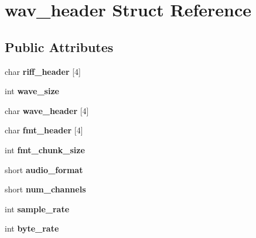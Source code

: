 \hypertarget{structwav__header}{}\section{wav\+\_\+header Struct Reference}
\label{structwav__header}
\subsection*{Public Attributes}
\begin{DoxyCompactItemize}
\item 
\mbox{\label{structwav__header_a977b8193bf1f39dbd815c6210f0bb6c6}} 
char {\bfseries riff\+\_\+header} \mbox{[}4\mbox{]}
\item 
\mbox{\label{structwav__header_a0a545b27959de2954b97469aaba34056}} 
int {\bfseries wave\+\_\+size}
\item 
\mbox{\label{structwav__header_a0dc0cff34ad7fe5e59c5cbcee1640354}} 
char {\bfseries wave\+\_\+header} \mbox{[}4\mbox{]}
\item 
\mbox{\label{structwav__header_a4039d1e8e91d7940aa45a29aad27b4ce}} 
char {\bfseries fmt\+\_\+header} \mbox{[}4\mbox{]}
\item 
\mbox{\label{structwav__header_a5fb4363d52bbff51ca2e8884408208c6}} 
int {\bfseries fmt\+\_\+chunk\+\_\+size}
\item 
\mbox{\label{structwav__header_a94c9ee0387f846c47eb9e97636994d93}} 
short {\bfseries audio\+\_\+format}
\item 
\mbox{\label{structwav__header_a625d84de0f598e50c072d725f6e3b6b8}} 
short {\bfseries num\+\_\+channels}
\item 
\mbox{\label{structwav__header_a0632019c676aa88f0351c0ab11461de0}} 
int {\bfseries sample\+\_\+rate}
\item 
\mbox{\label{structwav__header_a8330740d45200d6aee4ba54fc0d834d8}} 
int {\bfseries byte\+\_\+rate}
\item 
\mbox{\label{structwav__header_a2672b73c81973008677db6349fbc232a}} 

\end{DoxyCompactItemize}
